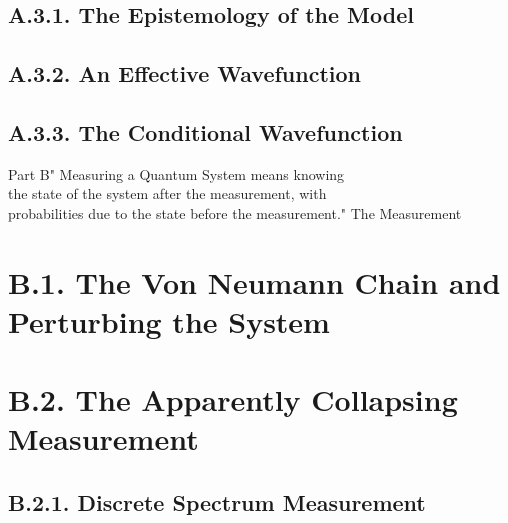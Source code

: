 \documentclass[11pt, a4paper]{article} %
\begin{document}
\subsection*{A.3.1. The Epistemology of the Model}

\subsection*{A.3.2. An Effective Wavefunction}


\subsection*{A.3.3. The Conditional Wavefunction}


\newpage
\begin{kapituloBerria}{Part B}{" Measuring a Quantum System means knowing\\ the state of the system after the measurement, with\\ probabilities due to the state before the measurement."}
The Measurement 
\end{kapituloBerria}
\newpage
\fancyhead[L]{\null}
\fancyhead[R]{\null}
\null
\clearpage


\section*{B.1. The Von Neumann Chain and Perturbing the System}

\section*{B.2. The Apparently Collapsing Measurement}

\subsection*{B.2.1. Discrete Spectrum Measurement}
\end{document}
